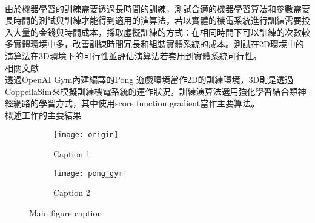 \begin{flushleft}
\fontsize{12pt}{12pt} \\
\end{flushleft}

由於機器學習的訓練需要透過長時間的訓練，測試合適的機器學習算法和參數需要長時間的測試與訓練才能得到適用的演算法，若以實體的機電系統進行訓練需要投入大量的金錢與時間成本，採取虛擬訓練的方式：在相同時間下可以訓練的次數較多實體環境中多，改善訓練時間冗長和組裝實體系統的成本。測試在2D環境中的演算法在3D環境下的可行性並評估演算法若套用到實體系統可行性。\\

相關文獻\\

透過OpenAI Gym內建編譯的Pong 遊戲環境當作2D的訓練環境，3D則是透過CoppeilaSim來模擬訓練機電系統的運作狀況，訓練演算法選用強化學習結合類神經網路的學習方式，其中使用score function gradient當作主要算法。\\

概述工作的主要結果\\


\begin{figure}[hbt!]	
	\centering
	\begin{subfigure}[]{placeholder}
		\texttt{[image: origin]}
		\caption{Caption 1}\label{fig:1a}		
	\end{subfigure}
	\begin{subfigure}[]{placeholder}
		\texttt{[image: pong\_gym]}
		\caption{Caption 2}\label{fig:1b}
	\end{subfigure}
	\caption{Main figure caption}\label{fig:1}
\end{figure}
\newpage